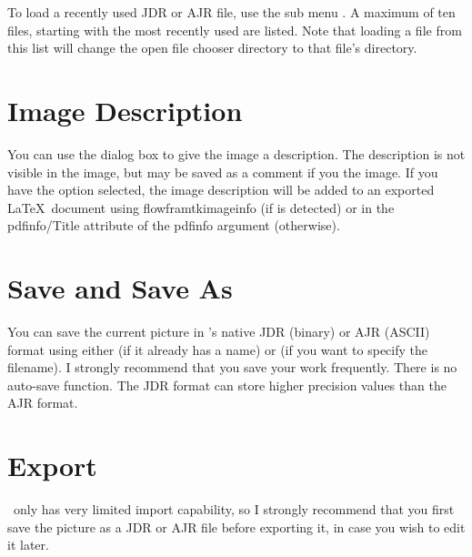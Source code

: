 
To load a recently used \gls{JDR} or \gls{AJR} file, use the sub
menu . A maximum of ten files, starting with the
most recently used are listed. Note that loading a file from this
list will change the open file chooser directory to that file's
directory.

\section{Image Description}\label{sec:imagedescription}


You can use the  dialog box to give the
image a description. The description is not visible in the image,
but may be saved as a comment if you  the image. If
you have the  option selected,
the image description will be added to an exported \LaTeX\ document
using \gls{flowframtkimageinfo} (if  is
detected) or in the \gls{pdfinfo/Title} attribute of the
\gls{pdfinfo} argument (otherwise).

\section{Save and Save As}\label{sec:saveimage}


You can save the current picture in \FlowframTk's native
\gls{JDR} (binary) or \gls{AJR} (ASCII) format using either
 (if it already has a name)
or  (if you want to specify the
filename).  I strongly recommend that you save your work frequently.
There is no auto-save function. The \gls{JDR} format can store
higher precision values than the \gls{AJR} format.

\section{Export}\label{sec:exportimage}


\begin{warning}
\FlowframTk\ only has very limited import capability, so I
strongly recommend that you first save the picture as a
\gls{JDR} or \gls{AJR} file before exporting it, in case you
wish to edit it later.
\end{warning}

